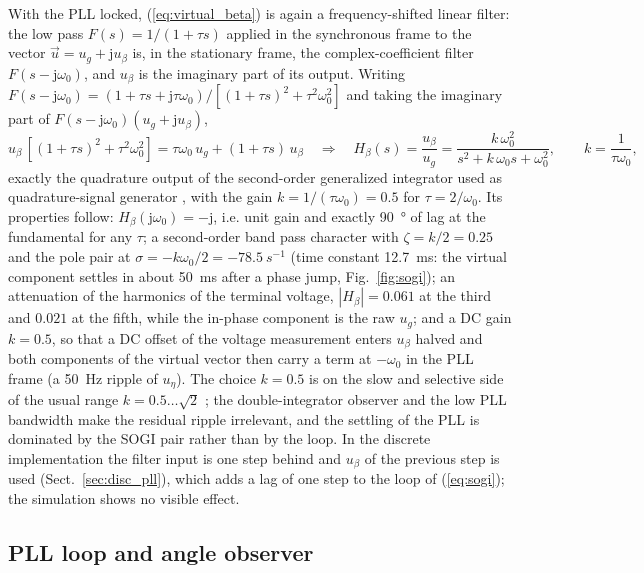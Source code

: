 \documentclass[10pt,a4paper]{scrartcl}
\newcommand{\wo}{\omega_0}
\newcommand{\jj}{\mathrm{j}}
\begin{document}
\begin{onehalfspace}
With the PLL locked, (\ref{eq:virtual_beta}) is again a frequency-shifted linear filter: the low pass $F(s) = 1/(1 + \tau s)$ applied in the synchronous frame to the vector $\vec u = u_g + \jj u_\beta$ is, in the stationary frame, the complex-coefficient filter $F(s - \jj\wo)$, and $u_\beta$ is the imaginary part of its output. Writing $F(s - \jj\wo) = (1 + \tau s + \jj\tau\wo)/[(1 + \tau s)^2 + \tau^2\wo^2]$ and taking the imaginary part of $F(s - \jj\wo)(u_g + \jj u_\beta)$,
\begin{equation}
u_\beta\,[(1 + \tau s)^2 + \tau^2\wo^2] = \tau\wo\,u_g + (1 + \tau s)\,u_\beta
\quad\Longrightarrow\quad
H_\beta(s) = \frac{u_\beta}{u_g} = \frac{k\,\wo^2}{s^2 + k\,\wo s + \wo^2}, \qquad k = \frac{1}{\tau\wo},
\label{eq:sogi}
\end{equation}
exactly the quadrature output of the second-order generalized integrator used as quadrature-signal generator \cite{ciobotaru2006, rodriguez2006}, with the gain $k = 1/(\tau\wo) = 0.5$ for $\tau = 2/\wo$. Its properties follow: $H_\beta(\jj\wo) = -\jj$, i.e. unit gain and exactly \SI{90}{\degree} of lag at the fundamental for any $\tau$; a second-order band pass character with $\zeta = k/2 = 0.25$ and the pole pair at $\sigma = -k\wo/2 = \SI{-78.5}{s^{-1}}$ (time constant \SI{12.7}{ms}: the virtual component settles in about \SI{50}{ms} after a phase jump, Fig.~\ref{fig:sogi}); an attenuation of the harmonics of the terminal voltage, $|H_\beta| = 0.061$ at the third and $0.021$ at the fifth, while the in-phase component is the raw $u_g$; and a DC gain $k = 0.5$, so that a DC offset of the voltage measurement enters $u_\beta$ halved and both components of the virtual vector then carry a term at $-\wo$ in the PLL frame (a \SI{50}{Hz} ripple of $u_\eta$). The choice $k = 0.5$ is on the slow and selective side of the usual range $k = 0.5 \ldots \sqrt2$ \cite{golestan2017}; the double-integrator observer and the low PLL bandwidth make the residual ripple irrelevant, and the settling of the PLL is dominated by the SOGI pair rather than by the loop. In the discrete implementation the filter input is one step behind and $u_\beta$ of the previous step is used (Sect.~\ref{sec:disc_pll}), which adds a lag of one step to the loop of (\ref{eq:sogi}); the simulation shows no visible effect.

\subsection{PLL loop and angle observer}
\label{sec:pllloop}


\end{onehalfspace}
\end{document}
